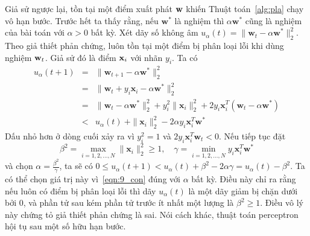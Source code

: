 Giả sử ngược lại, tồn tại một điểm xuất phát $\mathbf{w}$ khiến Thuật
toán~\ref{alg:pla} chạy vô hạn bước. Trước hết ta thấy rằng, nếu $\mathbf{w}^*$ là nghiệm thì $\alpha\mathbf{w}^*$ cũng là nghiệm của
bài toán với $\alpha > 0$ bất kỳ. Xét dãy số không âm $ u_{\alpha}(t) = \|\mathbf{w}_{t} -
\alpha\mathbf{w}^*\|_2^2$. Theo giả thiết phản chứng, luôn tồn tại một điểm bị phân
loại lỗi khi dùng nghiệm $\mathbf{w}_t$. Giả sử đó là điểm $\mathbf{x}_i$ với nhãn $y_i$. Ta
có
\begin{eqnarray}
\nonumber
u_{\alpha}(t+1) &=& \|\mathbf{w}_{t+1} - \alpha \mathbf{w}^*\|_2^2 \\\
\nonumber
&=& \|\mathbf{w}_{t} + y_i\mathbf{x}_i - \alpha\mathbf{w}^*\|_2^2 \\\
\nonumber
&=& \|\mathbf{w}_{t} -\alpha\mathbf{w}^*\|_2^2 + y_i^2\|\mathbf{x}_i\|_2^2 + 2y_i\mathbf{x}_i^T(\mathbf{w}_t - \alpha\mathbf{w}^*) \\\
\label{eqn:9_con}
&<& u_{\alpha}(t) \ + \|\mathbf{x}_i\|_2^2 - 2\alpha y_i\mathbf{x}_i^T \mathbf{w}^*
\end{eqnarray}
Dấu nhỏ hơn ở dòng cuối xảy ra vì $y_i^2 = 1$ và $2y_i\mathbf{x}_i^T\mathbf{w}_{t} <
0$. Nếu tiếp tục đặt
\begin{equation*}
\beta^2 = \max_{i=1, 2, \dots, N}\|\mathbf{x}_i\|_2^2 \geq 1, \quad
\gamma = \min_{i=1, 2, \dots, N} y_i\mathbf{x}_i^T\mathbf{w}^*
\end{equation*}
và chọn $\alpha = \frac{\beta^2}{\gamma}$, ta sẽ có
\begin{math}
0 \leq u_{\alpha}(t+1) < u_{\alpha}(t) + \beta^2 - 2\alpha\gamma = u_{\alpha}(t) - \beta^2.
\end{math} Ta có thể chọn giá trị này vì~\eqref{eqn:9_con} đúng với $\alpha$ bất kỳ. Điều này chỉ ra rằng nếu luôn có điểm bị phân loại lỗi thì dãy $u_{\alpha}(t)$ là một dãy giảm bị chặn dưới bởi 0, và phần tử sau kém phần tử trước ít nhất một lượng là $\beta^2\geq 1$. Điều vô lý này chứng tỏ giả thiết phản chứng là sai. Nói cách khác, thuật toán perceptron hội tụ sau một số hữu hạn bước.









